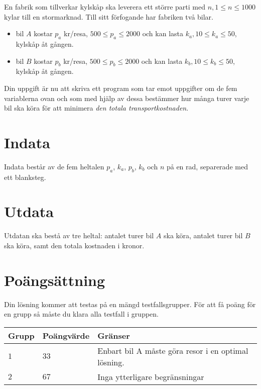 
En fabrik som tillverkar kylskåp ska leverera ett större parti med $n, 1 \le n \le 1000$ kylar till en stormarknad. Till sitt förfogande har fabriken två bilar.

\begin{itemize}
\item bil $A$ kostar $p_a$ kr/resa, $500 \le p_a \le 2000$ och kan lasta $k_a, 10 \le k_a \le 50$, kylskåp åt gången.
\item bil $B$ kostar $p_b$ kr/resa, $500 \le p_b \le 2000$ och kan lasta $k_b, 10 \le k_b \le 50$, kylskåp åt gången.
\end{itemize}

Din uppgift är nu att skriva ett program som tar emot uppgifter om de fem variablerna ovan och som med hjälp av dessa bestämmer hur många turer varje bil ska köra för att minimera \emph{den totala transportkostnaden}.

\section*{Indata}
Indata består av de fem heltalen $p_a$, $k_a$, $p_b$, $k_b$ och $n$ på en rad, separerade med ett blanksteg.

\section*{Utdata}
Utdatan ska bestå av tre heltal: antalet turer bil $A$ ska köra, antalet turer bil $B$ ska köra, samt den totala kostnaden i kronor.

\section*{Poängsättning}
Din lösning kommer att testas på en mängd testfallsgrupper.
För att få poäng för en grupp så måste du klara alla testfall i gruppen.

\noindent
\begin{tabular}{| l | l | l |}
  \hline
  Grupp & Poängvärde & Gränser \\ \hline
  $1$    & $33$        &  Enbart bil A måste göra resor i en optimal lösning. \\ \hline
  $2$    & $67$        &  Inga ytterligare begränsningar \\ \hline
\end{tabular}
